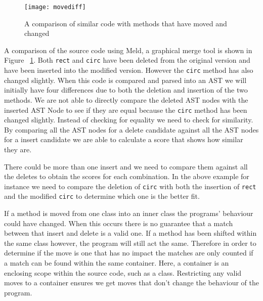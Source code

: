 \begin{figure}[!t]
\begin{center}
 \texttt{[image: movediff]}
 \end{center}
\caption{A comparison of similar code with methods that have moved and changed}
 \label{fig:modscreenshot}
\end{figure}


A comparison of the source code using Meld, a graphical merge tool is shown in Figure ~\ref{fig:modscreenshot}.
Both \lstinline{rect} and \lstinline{circ} have been deleted from the original version and have been inserted into the modified version.  
However the \lstinline{circ} method has also changed slightly. 
When this code is compared and parsed into an AST we will initially have four differences due to both the deletion and insertion of the two methods.    
We are not able to directly compare the deleted AST nodes with the inserted AST Node to see if they are equal because the \lstinline{circ} method has been changed slightly. 
Instead of checking for equality we need to check for similarity.
By comparing all the AST nodes for a delete candidate against all the AST nodes for a insert candidate we are able to calculate a score that shows how similar they are.

There could be more than one insert and we need to compare them against all the deletes to obtain the scores for each combination.
In the above example for instance we need to compare the deletion of \lstinline{circ} with both the insertion of \lstinline{rect} and the modified \lstinline{circ} to determine which one is the better fit.

If a method is moved from one class into an inner class the programs' behaviour could have changed. 
When this occurs there is no guarantee that a match between that insert and delete is a valid one.
If a method has been shifted within the same class however, the program will still act the same.  
Therefore in order to determine if the move is one that has no impact the matches are only counted if a match can be found within the same container.  
Here, a container is an enclosing scope within the source code, such as a class. 
Restricting any valid moves to a container ensures we get moves that don't change the behaviour of the program.

